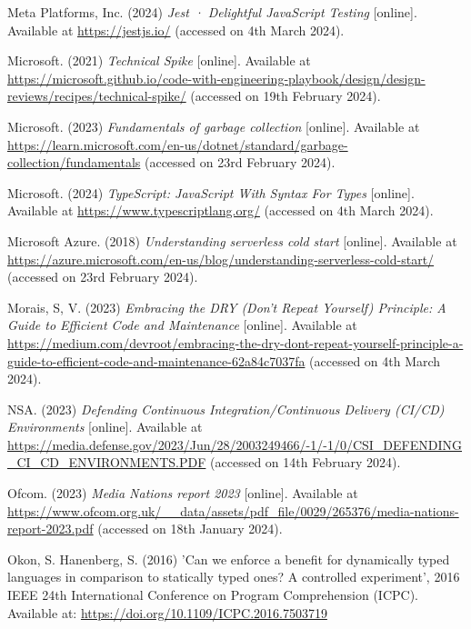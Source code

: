 \noindent Meta Platforms, Inc. (2024) \textit{Jest · Delightful JavaScript Testing} [online]. Available at \url{https://jestjs.io/} (accessed on 4th March 2024).
\vspace{0.2cm}

\noindent Microsoft. (2021) \textit{Technical Spike} [online]. Available at \url{https://microsoft.github.io/code-with-engineering-playbook/design/design-reviews/recipes/technical-spike/} (accessed on 19th February 2024).
\vspace{0.2cm}

\noindent Microsoft. (2023) \textit{Fundamentals of garbage collection} [online]. Available at \url{https://learn.microsoft.com/en-us/dotnet/standard/garbage-collection/fundamentals} (accessed on 23rd February 2024).
\vspace{0.2cm}

\noindent Microsoft. (2024) \textit{TypeScript: JavaScript With Syntax For Types} [online]. Available at \url{https://www.typescriptlang.org/} (accessed on 4th March 2024).
\vspace{0.2cm}

\noindent Microsoft Azure. (2018) \textit{Understanding serverless cold start} [online]. Available at \url{https://azure.microsoft.com/en-us/blog/understanding-serverless-cold-start/} (accessed on 23rd February 2024).
\vspace{0.2cm}

\noindent Morais, S, V. (2023) \textit{Embracing the DRY (Don't Repeat Yourself) Principle: A Guide to Efficient Code and Maintenance} [online]. Available at \url{https://medium.com/devroot/embracing-the-dry-dont-repeat-yourself-principle-a-guide-to-efficient-code-and-maintenance-62a84c7037fa} (accessed on 4th March 2024).
\vspace{0.2cm}

\noindent NSA. (2023) \textit{Defending Continuous Integration/Continuous Delivery (CI/CD) Environments} [online]. Available at \url{https://media.defense.gov/2023/Jun/28/2003249466/-1/-1/0/CSI_DEFENDING_CI_CD_ENVIRONMENTS.PDF} (accessed on 14th February 2024).
\vspace{0.2cm}

\noindent Ofcom. (2023) \textit{Media Nations report 2023} [online]. Available at \url{https://www.ofcom.org.uk/__data/assets/pdf_file/0029/265376/media-nations-report-2023.pdf} (accessed on 18th January 2024).
\vspace{0.2cm}

\noindent Okon, S. Hanenberg, S. (2016) 'Can we enforce a benefit for dynamically typed languages in comparison to statically typed ones? A controlled experiment', 2016 IEEE 24th International Conference on Program Comprehension (ICPC). Available at: \url{https://doi.org/10.1109/ICPC.2016.7503719}
\vspace{0.2cm}

